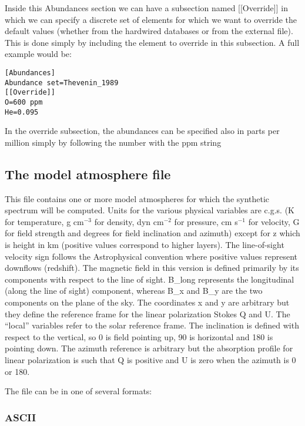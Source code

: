 Inside this Abundances section we can have a subsection named
[[Override]] in which we can specify a discrete set of elements for
which we want to override the default values (whether from the
hardwired databases or from the external file). This is done simply by
including the element to override in this subsection. A full example
would be:

\begin{verbatim}
[Abundances]
Abundance set=Thevenin_1989
[[Override]]
O=600 ppm
He=0.095
\end{verbatim}

In the override subsection, the abundances can be specified also in
parts per million simply by following the number with the ppm string

\subsection{The model atmosphere file}
\label{modelfile}

This file contains one or more model atmospheres for which the
synthetic spectrum will be computed. Units for the various physical
variables are c.g.s. (K for temperature, g cm$^{-3}$ for density, dyn
cm$^{-2}$ for pressure, cm s$^{-1}$ for velocity, G for field strength
and degrees for field inclination and azimuth) except for z which is
height in km (positive values correspond to higher layers). The
line-of-sight velocity sign follows the Astrophysical convention where
positive values represent downflows (redshift). The magnetic field in
this version is defined primarily by its components with respect to
the line of sight. B\_long represents the longitudinal (along the line
of sight) component, whereas B\_x and B\_y are the two components on
the plane of the sky. The coordinates x and y are arbitrary but they
define the reference frame for the linear polarization Stokes Q and
U. The ``local'' variables refer to the solar reference frame. The
inclination is defined with respect to the vertical, so 0 is field
pointing up, 90 is horizontal and 180 is pointing down. The azimuth
reference is arbitrary but the absorption profile for linear
polarization is such that Q is positive and U is zero when the azimuth
is 0 or 180.

The file can be in one of several formats:

\subsubsection{ASCII}

